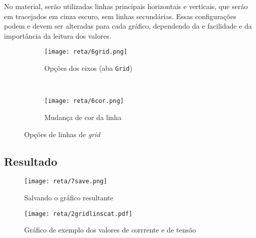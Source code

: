     No material, serão utilizadas linhas principais horizontais e verticais, que serão em tracejados em cinza escuro, sem linhas secundárias. Essas configurações podem e devem ser alteradas para cada gráfico, dependendo da e facilidade e da importância da leitura dos valores.

    \begin{figure}[htbp]
        \centering
        \begin{subfigure}{0.45\textwidth}
            \centering
            \texttt{[image: reta/6grid.png]}

            \caption{Opções dos eixos (aba \texttt{Grid})}
            \label{fig:reta:grid}
        \end{subfigure}
        ~
        \begin{subfigure}{0.45\textwidth}
            \centering
            \texttt{[image: reta/6cor.png]}

            \caption{Mudança de cor da linha}
            \label{fig:reta:gridcor}
        \end{subfigure}
        \caption{Opções de linhas de \textit{grid}}
        \label{fig:reta:opcoes_eixo}
    \end{figure}


\subsection{Resultado}

    \begin{figure}[htbp]
        \centering
        \texttt{[image: reta/7save.png]}

        \caption{Salvando o gráfico resultante}
        \label{fig:reta:salvar}
    \end{figure}

    \begin{figure}[htbp]
        \centering
        \texttt{[image: reta/2gridlinscat.pdf]}

        \caption{Gráfico de exemplo dos valores de corrrente e de tensão}
        \label{fig:reta:gridlinscat}
    \end{figure}

